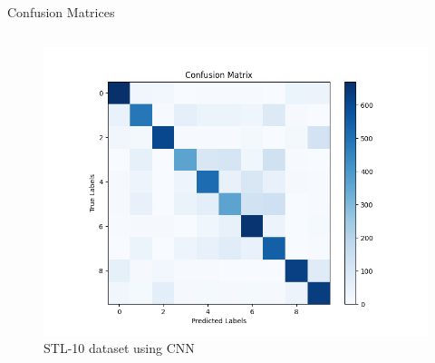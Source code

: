 \begin{frame}[fragile]{Confusion Matrices}
\begin{columns}
    \begin{column}{0.3\textwidth}
      \begin{figure}[!ht]
        \includegraphics[width=\textwidth]{images/stl10_cm.png}
        \small STL-10 dataset using CNN
      \end{figure}
    \end{column}
  \end{columns}
\end{frame}